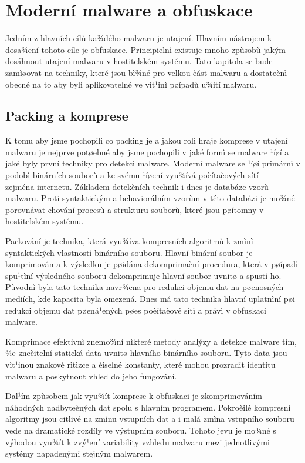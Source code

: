 \chapter{Moderní malware a obfuskace}
Jedním z hlavních cílù ka¾dého malwaru je utajení. Hlavním nástrojem k dosa¾ení tohoto cíle je obfuskace. Principielnì existuje mnoho zpùsobù jakým dosáhnout utajení malwaru v hostitelském systému. Tato kapitola se bude zamìøovat na techniky, které jsou bì¾né pro velkou èást malwaru a dostateènì obecné na to aby byli aplikovatelné ve vìt¹inì pøípadù u¾ití malwaru.

\section{Packing a komprese}
K tomu aby jsme pochopili co packing je a jakou roli hraje komprese v utajení malwaru je nejprve potøebné aby jsme pochopili v jaké formì se malware ¹íøí a jaké byly první techniky pro detekci malware. Moderní malware se ¹íøí primárnì v podobì binárních souborù a ke svému ¹íøení vyu¾ívá poèítaèových sítí --- zejména internetu. Základem detekèních technik i dnes je databáze vzorù malwaru. Proti syntaktickým a behaviorálním vzorùm v této databázi je mo¾né porovnávat chování procesù a strukturu souborù, které jsou pøítomny v hostitelském systému. 

Packování je technika, která vyu¾íva kompresních algoritmù k zmìnì syntaktických vlastností binárního souboru. Hlavní binární soubor je komprimován a k výsledku je pøidána dekomprimaèní procedura, která v pøípadì spu¹tìní výsledného souboru dekomprimuje hlavní soubor uvnitø a spustí ho. Pùvodnì byla tato technika navr¾ena pro redukci objemu dat na pøenosných mediích, kde kapacita byla omezená. Dnes má tato technika hlavní uplatnìní pøi redukci objemu dat pøená¹ených pøes poèítaèové sítì a právì v obfuskaci malware.

Komprimace efektivnì znemo¾ní nìkteré metody analýzy a detekce malware tím, ¾e zneèitelní statická data uvnitø hlavního binárního souboru. Tyto data jsou vìt¹inou znakové rìtìzce a èíselné konstanty, které mohou prozradit identitu malwaru a poskytnout vhled do jeho fungování. 

Dal¹ím zpùsobem jak vyu¾ít komprese k obfuskaci je zkomprimováním náhodných nadbyteèných dat spolu s hlavním programem. Pokroèilé kompresní algoritmy jsou citlivé na zmìnu vstupních dat a i malá zmìna vstupního souboru vede na dramatické rozdíly ve výstupním souboru. Tohoto jevu je mo¾né s výhodou vyu¾ít k zvý¹ení variability vzhledu malwaru mezi jednotlivými systémy napadenými stejným malwarem.


